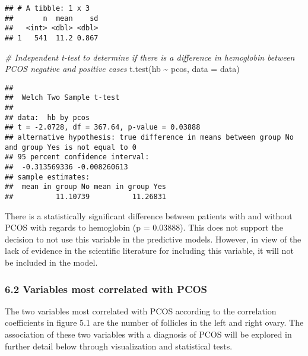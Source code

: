 \documentclass[
]{article}
\newenvironment{Shaded}{\begin{snugshade}}{\end{snugshade}}
\newcommand{\AttributeTok}[1]{\textcolor[rgb]{0.77,0.63,0.00}{#1}}
\newcommand{\CommentTok}[1]{\textcolor[rgb]{0.56,0.35,0.01}{\textit{#1}}}
\newcommand{\FunctionTok}[1]{\textcolor[rgb]{0.00,0.00,0.00}{#1}}
\newcommand{\NormalTok}[1]{#1}
\newcommand{\SpecialCharTok}[1]{\textcolor[rgb]{0.00,0.00,0.00}{#1}}
\begin{document}
\begin{verbatim}
## # A tibble: 1 x 3
##       n  mean    sd
##   <int> <dbl> <dbl>
## 1   541  11.2 0.867
\end{verbatim}

\begin{Shaded}
\begin{Highlighting}[]
\CommentTok{\# Independent t{-}test to determine if there is a difference in hemoglobin between PCOS negative and positive cases}
\FunctionTok{t.test}\NormalTok{(hb }\SpecialCharTok{\textasciitilde{}}\NormalTok{ pcos, }\AttributeTok{data =}\NormalTok{ data)}
\end{Highlighting}
\end{Shaded}

\begin{verbatim}
## 
##  Welch Two Sample t-test
## 
## data:  hb by pcos
## t = -2.0728, df = 367.64, p-value = 0.03888
## alternative hypothesis: true difference in means between group No and group Yes is not equal to 0
## 95 percent confidence interval:
##  -0.313569336 -0.008260613
## sample estimates:
##  mean in group No mean in group Yes 
##          11.10739          11.26831
\end{verbatim}

There is a statistically significant difference between patients with
and without PCOS with regards to hemoglobin (p = 0.03888). This does not
support the decision to not use this variable in the predictive models.
However, in view of the lack of evidence in the scientific literature
for including this variable, it will not be included in the model.

\hypertarget{variables-most-correlated-with-pcos}{%
\subsubsection{6.2 Variables most correlated with
PCOS}\label{variables-most-correlated-with-pcos}}

The two variables most correlated with PCOS according to the correlation
coefficients in figure 5.1 are the number of follicles in the left and
right ovary. The association of these two variables with a diagnosis of
PCOS will be explored in further detail below through visualization and
statistical tests.
\end{document}
